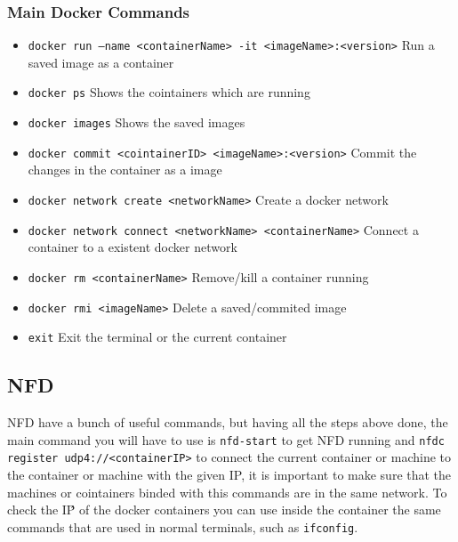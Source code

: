 \documentclass[11pt,conference]{./IEEEtran}
\begin{document}
\subsubsection{Main Docker Commands}
\begin{itemize}
 \item \texttt{docker run --name <containerName> -it <imageName>:<version>}
 Run a saved image as a container
 \item \texttt{docker ps}
 Shows the cointainers which are running
 \item \texttt{docker images}
 Shows the saved images
 \item \texttt{docker commit <cointainerID>  <imageName>:<version>}
 Commit the changes in the container as a image
 \item \texttt{docker network create <networkName>}
 Create a docker network
 \item \texttt{docker network connect <networkName> <containerName>}
 Connect a container to a existent docker network
 \item \texttt{docker rm <containerName>}
 Remove/kill a container running
 \item \texttt{docker rmi <imageName>}
 Delete a saved/commited image
 \item \texttt{exit} 
 Exit the terminal or the current container
\end{itemize}


\subsection{NFD}
NFD have a bunch of useful commands, but having all the steps above done, the main command you will have to use is \verb|nfd-start| to get NFD running and \verb|nfdc register udp4://<containerIP>| to connect the current container or machine to the container or machine with the given IP, it is important to make sure that the machines or cointainers binded with this commands are in the same network.
To check the IṔ of the docker containers you can use inside the container the same commands that are used in normal terminals, such as \verb|ifconfig|.

\end{document}

